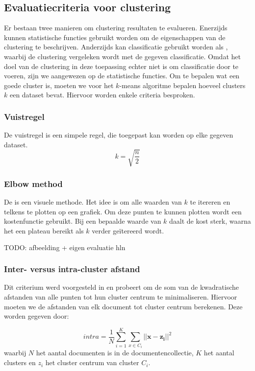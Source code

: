 \subsection{Evaluatiecriteria voor clustering}\label{evaluatie-clustering}
Er bestaan twee manieren om clustering resultaten te evalueren. Enerzijds kunnen statistische functies gebruikt worden om de eigenschappen van de clustering te beschrijven. Anderzijds kan classificatie gebruikt worden als , waarbij de clustering vergeleken wordt met de gegeven classificatie. Omdat het doel van de clustering in deze toepassing echter niet is om classificatie door te voeren, zijn we aangewezen op de statistische functies. Om te bepalen wat een goede cluster is, moeten we voor het $k$-means algoritme bepalen hoeveel clusters $k$ een dataset bevat. Hiervoor worden enkele criteria besproken.

\subsubsection{Vuistregel}
De vuistregel is een simpele regel, die toegepast kan worden op elke gegeven dataset. 
\begin{equation}
k = \sqrt{\frac{n}{2}}
\end{equation}

\subsubsection{Elbow method}
De  \cite{Science2013} is een visuele methode. Het idee is om alle waarden van $k$ te itereren en telkens te plotten op een grafiek. Om deze punten te kunnen plotten wordt een kostenfunctie gebruikt. Bij een bepaalde waarde van $k$ daalt de kost sterk, waarna het een plateau bereikt als $k$ verder ge\"itereerd wordt.

TODO: afbeelding + eigen evaluatie hln

\subsubsection{Inter- versus intra-cluster afstand}
Dit criterium werd voorgesteld in \cite{Ray} en probeert om de som van de kwadratische afstanden van alle punten tot hun cluster centrum te minimaliseren. Hiervoor moeten we de afstanden van elk document tot cluster centrum berekenen. Deze worden gegeven door:

\begin{equation}
intra = \frac{1}{N}\sum_{i=1}^{K}\sum_{x\in{C_i}}^{} \vert\vert \mathbf{x-z_i} \vert\vert ^2 
\end{equation}
waarbij $N$ het aantal documenten is in de documentencollectie, $K$ het aantal clusters en $z_i$ het cluster centrum van cluster $C_i$.

